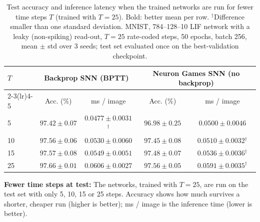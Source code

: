 \documentclass{article}
\begin{document}
\begin{table}[H]
\centering
\small
\caption{Test accuracy and inference latency when the trained networks are run for fewer time steps $T$ (trained with $T=25$). Bold: better mean per row. $^\dagger$Difference smaller than one standard deviation. MNIST, 784--128--10 LIF network with a leaky (non-spiking) read-out, $T=25$ rate-coded steps, 50 epochs, batch 256, mean $\pm$ std over 3 seeds; test set evaluated once on the best-validation checkpoint.}
\label{tab:t1-steps}
\begin{tabular}{lcccc}
\toprule
\multirow{2}{*}{$T$} & \multicolumn{2}{c}{Backprop SNN (BPTT)} & \multicolumn{2}{c}{Neuron Games SNN (no backprop)} \\
\cmidrule(lr){2-3}\cmidrule(lr){4-5}
 & Acc. (\%) & ms / image & Acc. (\%) & ms / image \\
\midrule
5 & $\boldsymbol{97.42 \pm 0.07}$ & $\boldsymbol{0.0477 \pm 0.0031}$$^\dagger$ & $96.98 \pm 0.25$ & $0.0500 \pm 0.0046$ \\
10 & $\boldsymbol{97.56 \pm 0.06}$ & $0.0530 \pm 0.0060$ & $97.45 \pm 0.08$ & $\boldsymbol{0.0510 \pm 0.0032}$$^\dagger$ \\
15 & $\boldsymbol{97.57 \pm 0.08}$ & $0.0549 \pm 0.0051$ & $97.48 \pm 0.07$ & $\boldsymbol{0.0536 \pm 0.0036}$$^\dagger$ \\
25 & $\boldsymbol{97.66 \pm 0.01}$ & $0.0606 \pm 0.0027$ & $97.56 \pm 0.05$ & $\boldsymbol{0.0591 \pm 0.0035}$$^\dagger$ \\
\bottomrule
\end{tabular}
\end{table}

{\small
\noindent\textbf{Fewer time steps at test:} The networks, trained with $T=25$, are run on the test set with only
5, 10, 15 or 25 steps. Accuracy shows how much survives a shorter, cheaper run (higher is better); ms / image is
the inference time (lower is better).
}
\end{document}
